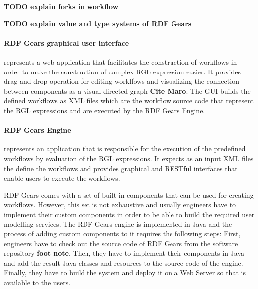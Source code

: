 \textbf{TODO explain forks in workflow}

\textbf{TODO explain value and type systems of RDF Gears}


\paragraph{RDF Gears graphical user interface} represents a web application that facilitates the construction of workflows in order to make the construction of complex RGL expression easier. It provides drag and drop operation for editing worklfows and visualizing the connection between components as a visual directed graph \textbf{Cite Maro}. The GUI builds the defined workflows as XML files which are the workflow source code that represent the RGL expressions and are executed by the RDF Gears Engine.

\paragraph{RDF Gears Engine} represents an application that is responsible for the execution of the predefined workflows by evaluation of the RGL expressions. It expects as an input XML files the define the workflows and  provides graphical and RESTful interfaces that enable users to execute the workflows.

RDF Gears comes with a set of built-in components that can be used for creating workflows. However, this set is not exhaustive and usually engineers have to implement their custom components in order to be able to build the required user modelling services. The RDF Gears engine is implemented in Java and the process of adding custom components to it requires the following steps: First, engineers have to check out the source code of RDF Gears from the software repository \textbf{foot note}. Then, they have to implement their components in Java and add the result Java classes and resources to the source code of the engine.  Finally, they have to build the system and deploy it on a Web Server so that is available to the users.


